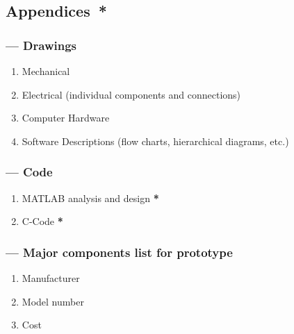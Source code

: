 \documentclass[twocolumn]{article}
\begin{document}







 














\subsection*{Appendices{\color{red}\ *}}
\subsubsection*{ --- Drawings}
\begin{enumerate}
\item{Mechanical}
\item{Electrical (individual components and connections)}
\item{Computer Hardware}
\item{Software Descriptions (flow charts, hierarchical diagrams, etc.)}
\end{enumerate}

\subsubsection*{ --- Code}
\begin{enumerate}
\item{MATLAB analysis and design}   {\color{red}\bf{*}}
\item{C-Code} {\color{red}\bf{*}}
\end{enumerate}
\subsubsection*{ --- Major components list for prototype}
\begin{enumerate}
\item{Manufacturer}
\item{Model number}
\item{Cost}
\end{enumerate}
\end{document}

